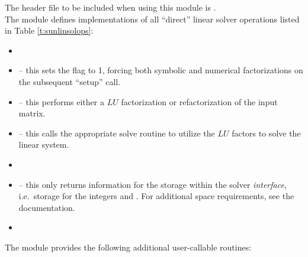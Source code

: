 \noindent The header file to be included when using this module 
is . \\
The {\sunlinsolklu} module defines implementations of all
``direct'' linear solver operations listed in
Table \ref{t:sunlinsolops}:
\begin{itemize}
\item {}
\item {} -- this sets the
   flag to 1, forcing both symbolic and numerical
  factorizations on the subsequent ``setup'' call.
\item {} -- this performs either a $LU$
  factorization or refactorization of the input matrix.
\item {} -- this calls the appropriate {\klu}
  solve routine to utilize the $LU$ factors to solve the linear
  system. 
\item {}
\item {} -- this only returns information for
  the storage within the solver \emph{interface}, i.e.~storage for the
  integers  and .  For additional
  space requirements, see the {\klu} documentation.
\item {}
\end{itemize}
The module {\sunlinsolklu} provides the following additional
user-callable routines: 
